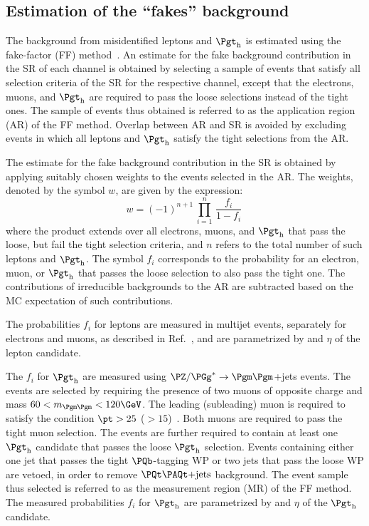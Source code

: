 \subsection{Estimation of the ``fakes'' background}
\label{sec:backgroundEstimation_fakes}

The background from misidentified leptons and $\tauh$ is estimated using the fake-factor (FF) method~\cite{Sirunyan:2018shy}.
An estimate for the fake background contribution in the SR of each channel is obtained
by selecting a sample of events that satisfy all selection criteria of the SR for the respective channel,
except that the electrons, muons, and $\tauh$ are required to pass the loose selections instead of the tight ones.
The sample of events thus obtained is referred to as the application region (AR) of the FF method.
Overlap between AR and SR is avoided by excluding events in which all leptons and $\tauh$ satisfy the tight selections from the AR.

The estimate for the fake background contribution in the SR is obtained by applying suitably chosen weights to the events selected in the AR.
The weights, denoted by the symbol $w$, are given by the expression:
\begin{equation}
w = (-1)^{n+1} \, \prod_{i=1}^{n} \, \frac{f_{i}}{1 - f_{i}}\,
\label{eq:FF_weights}
\end{equation}
where the product extends over all electrons, muons, and $\tauh$
that pass the loose, but fail the tight selection criteria,
and $n$ refers to the total number of such leptons and $\tauh$.
The symbol $f_{i}$ corresponds to the probability for an electron, muon, or $\tauh$ that passes the loose selection to also pass the tight one.
The contributions of irreducible backgrounds to the AR are subtracted based on the MC expectation of such contributions.

The probabilities $f_{i}$ for leptons are measured in multijet events, separately for electrons and muons, as described in Ref.~\cite{Sirunyan:2020icl},
and are parametrized by \pt and $\eta$ of the lepton candidate.

The $f_{i}$ for $\tauh$ are measured using $\Zmm$+jets events.
The events are selected by requiring the presence of two muons of opposite charge and mass $60 < m_{\Pgm\Pgm} < 120\GeV$.
The leading (subleading) muon is required to satisfy the condition $\pt > 25$ ($> 15$)~\GeV.
Both muons are required to pass the tight muon selection.
The events are further required to contain at least one $\tauh$ candidate that passes the loose $\tauh$ selection.
Events containing either one jet that passes the tight $\Pbottom$-tagging WP or two jets that pass the loose WP are vetoed,
in order to remove $\ttbar$ background.
The event sample thus selected is referred to as the measurement region (MR) of the FF method.
The measured probabilities $f_{i}$ for $\tauh$ are parametrized by \pt and $\eta$ of the $\tauh$ candidate.



